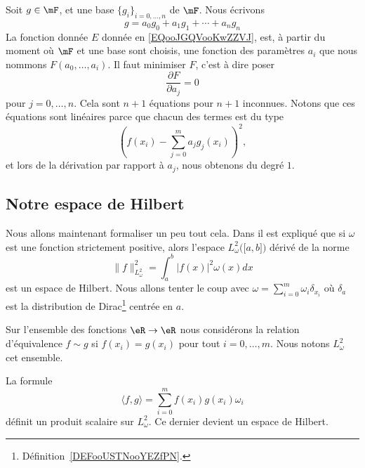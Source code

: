Soit \( g\in \mF\), et une base \( \{ g_i \}_{i=0,\ldots, n}\) de \( \mF\). Nous écrivons
\begin{equation}
    g=a_0g_0+a_1g_1+\cdots +a_ng_n
\end{equation}
La fonction donnée \( E\) donnée en \eqref{EQooJGQVooKwZZVJ}, est, à partir du moment où \( \mF\) et une base sont choisis, une fonction des paramètres \( a_i\) que nous nommons \( F(a_0,\ldots, a_i)\). Il faut minimiser \( F\), c'est à dire poser
\begin{equation}
    \frac{ \partial F }{ \partial a_j }=0
\end{equation}
pour \( j=0,\ldots, n\). Cela sont \( n+1\) équations pour \( n+1\) inconnues. Notons que ces équations sont linéaires parce que chacun des termes est du type
\begin{equation}
    \left( f(x_i)-\sum_{j=0}^ma_jg_j(x_i) \right)^2,
\end{equation}
et lors de la dérivation par rapport à \( a_j\), nous obtenons du degré \( 1\).

\subsection{Notre espace de Hilbert}

Nous allons maintenant formaliser un peu tout cela. Dans \cite{ooPTFGooScbUWC} il est expliqué que si \( \omega\) est une fonction strictement positive, alors l'espace \( L^2_{\omega}\big( \mathopen[ a , b \mathclose] \big)\) dérivé de la norme
\begin{equation}
    \| f \|_{L^2_{\omega}}^2=\int_a^b| f(x) |^2\omega(x)dx
\end{equation}
est un espace de Hilbert. Nous allons tenter le coup avec \( \omega=\sum_{i=0}^m\omega_i\delta_{x_i}\) où \( \delta_a\) est la distribution de Dirac\footnote{Définition~\ref{DEFooUSTNooYEZfPN}.} centrée en \( a\).

Sur l'ensemble des fonctions \( \eR\to\eR\) nous considérons la relation d'équivalence \( f\sim g\) si \( f(x_i)=g(x_i)\) pour tout \( i=0,\ldots, m\). Nous notons \(  L^2_{\omega}  \) cet ensemble.

\begin{proposition}
    La formule
    \begin{equation}        \label{EQooVUKMooIjpkXO}
        \langle f, g\rangle =\sum_{i=0}^mf(x_i)g(x_i)\omega_i
    \end{equation}
    définit un produit scalaire sur \( L^2_{\omega}\). Ce dernier devient un espace de Hilbert.
\end{proposition}


